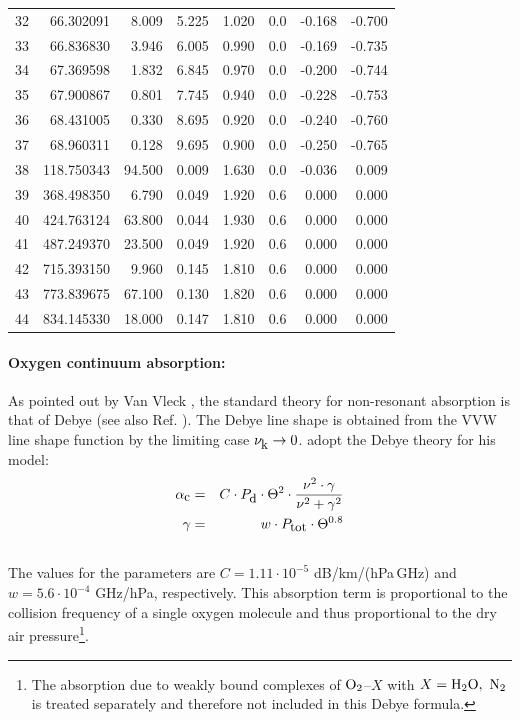 \begin{longtable}{lrrrrrrr}
32 & 66.302091 &   8.009 &  5.225 &    1.020 & 0.0 &  -0.168 &   -0.700\\
33 & 66.836830 &   3.946 &  6.005 &    0.990 & 0.0 &  -0.169 &   -0.735\\
34 & 67.369598 &   1.832 &  6.845 &    0.970 & 0.0 &  -0.200 &   -0.744\\
35 & 67.900867 &   0.801 &  7.745 &    0.940 & 0.0 &  -0.228 &   -0.753\\
36 & 68.431005 &   0.330 &  8.695 &    0.920 & 0.0 &  -0.240 &   -0.760\\
37 & 68.960311 &   0.128 &  9.695 &    0.900 & 0.0 &  -0.250 &   -0.765\\
38 & 118.750343 &  94.500 &  0.009 &   1.630 & 0.0 &  -0.036 &    0.009\\
39 & 368.498350 &   6.790 &  0.049 &   1.920 & 0.6 &   0.000 &    0.000\\
40 & 424.763124 &  63.800 &  0.044 &   1.930 & 0.6 &   0.000 &    0.000\\
41 & 487.249370 &  23.500 &  0.049 &   1.920 & 0.6 &   0.000 &    0.000\\
42 & 715.393150 &   9.960 &  0.145 &   1.810 & 0.6 &   0.000 &    0.000\\
43 & 773.839675 &  67.100 &  0.130 &   1.820 & 0.6 &   0.000 &    0.000\\
44 & 834.145330 &  18.000 &  0.147 &   1.810 & 0.6 &   0.000 &    0.000\\
\end{longtable}

\paragraph{Oxygen continuum absorption:}
\label{levele:mpm93_o2cont}
As pointed out by Van Vleck \citep{vv:87}, the standard theory for
non-resonant absorption is that of Debye (see also Ref. \citet{townes:55}). 
The Debye line shape is obtained from the VVW line shape function 
by the limiting case $\nu_{\mbox{\rm \small k}} \rightarrow 0$.
\citet{liebeetal:93} adopt the Debye theory for his model:
\begin{eqnarray}
  \label{eq:abs_theory:mpm93_o2cont}
  \alphac &=&  C \cdot \pda \cdot \Theta^2 \cdot 
               \frac{\nu^2 \cdot \gamma}{\nu^2+\gamma^2}\\
%
  \label{eq:abs_theory:mpm93_o2cont_1}
  \gamma  &=&  w \cdot \ptot \cdot \Theta^{0.8}\nonumber\\
\nonumber
\end{eqnarray}
The values for the parameters are $C = 1.11\cdot 10^{-5}$ dB/km/(hPa\,GHz) and 
$w = 5.6 \cdot 10^{-4}$ GHz/hPa, respectively. This absorption
term is proportional to the collision frequency of a single oxygen molecule
and thus proportional to the dry air pressure\footnote{The absorption
  due to weakly bound complexes of $\mbox{O}_2$--$X$ with $X=\mbox{H}_2\mbox{O},~\mbox{N}_2$ is 
  treated separately and therefore not included in this Debye
  formula.}.

